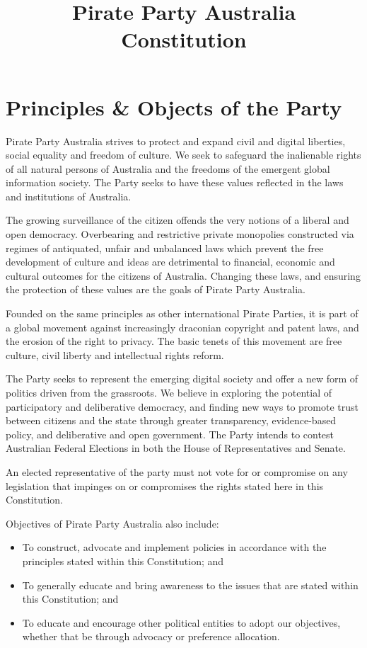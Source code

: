 \documentclass[a4paper,titlepage,8.5pt]{article}
\title{Pirate Party Australia Constitution}
\begin{document}
\tableofcontents
\thispagestyle{empty}
\newpage

\setcounter{page}{1}

\part{Principles \& Objects of the Party}
Pirate Party Australia strives to protect and expand civil and digital liberties, social equality and freedom of culture. We seek to safeguard the inalienable rights of all natural persons of Australia and the freedoms of the emergent global information society. The Party seeks to have these values reflected in the laws and institutions of Australia.

The growing surveillance of the citizen offends the very notions of a liberal and open democracy. Overbearing and restrictive private monopolies constructed via regimes of antiquated, unfair and unbalanced laws which prevent the free development of culture and ideas are detrimental to financial, economic and cultural outcomes for the citizens of Australia. Changing these laws, and ensuring the protection of these values are the goals of Pirate Party Australia.

Founded on the same principles as other international Pirate Parties, it is part of a global movement against increasingly draconian copyright and patent laws, and the erosion of the right to privacy. The basic tenets of this movement are free culture, civil liberty and intellectual rights reform.

The Party seeks to represent the emerging digital society and offer a new form of politics driven from the grassroots. We believe in exploring the potential of participatory and deliberative democracy, and finding new ways to promote trust between citizens and the state through greater transparency, evidence-based policy, and deliberative and open government. The Party intends to contest Australian Federal Elections in both the House of Representatives and Senate.

An elected representative of the party must not vote for or compromise on any legislation that impinges on or compromises the rights stated here in this Constitution.


Objectives of Pirate Party Australia also include:
\begin{itemize}
\item To construct, advocate and implement policies in accordance with the principles stated within this Constitution; and
\item To generally educate and bring awareness to the issues that are stated within this Constitution; and
\item To educate and encourage other political entities to adopt our objectives, whether that be through advocacy or preference allocation.
\end{itemize}
\end{document}
